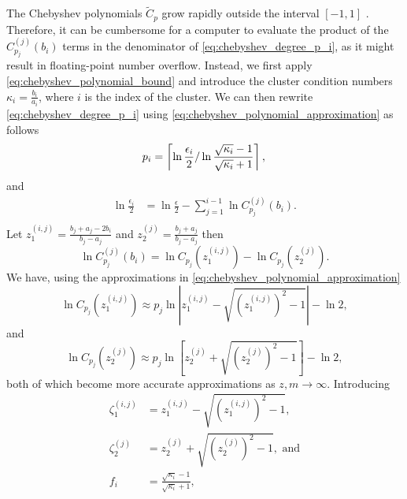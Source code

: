 The Chebyshev polynomials $\tilde{C}_p$ grow rapidly outside the interval $[-1,1]$ \cite[Section 4]{cg_sharpened_convrate_Axelsson1976}. Therefore, it can be cumbersome for a computer to evaluate the product of the $C^{(j)}_{p_j}(b_i)$ terms in the denominator of \cref{eq:chebyshev_degree_p_i}, as it might result in floating-point number overflow. Instead, we first apply \cref{eq:chebyshev_polynomial_bound} and introduce the cluster condition numbers $\kappa_i = \frac{b_i}{a_i}$, where $i$ is the index of the cluster. We can then rewrite \cref{eq:chebyshev_degree_p_i} using \cref{eq:chebyshev_polynomial_approximation} as follows
\begin{equation*}
    p_i  =  \left\lceil\ln{\frac{\epsilon_i}{2}} / \ln{\frac{\sqrt{\kappa_i} - 1}{\sqrt{\kappa_i} + 1}}\right\rceil, \\
\end{equation*}
and
\begin{align*}
    \ln{\frac{\epsilon_i}{2}} & = \ln{\frac{\epsilon}{2}} - \sum_{j=1}^{i-1} \ln{C^{(j)}_{p_j}(b_i)}. \\
\end{align*}
Let $z^{(i,j)}_1 = \frac{b_j + a_j - 2b_i}{b_j - a_j}$ and $z^{(j)}_2 = \frac{b_j + a_j}{b_j - a_j}$ then
\begin{equation*}
    \ln{C^{(j)}_{p_j}(b_i)} = \ln{C_{p_j}(z^{(i,j)}_1)} - \ln{C_{p_j}(z^{(j)}_2)}.
\end{equation*}
We have, using the approximations in \cref{eq:chebyshev_polynomial_approximation}
\begin{equation}
    \ln{C_{p_j}(z^{(i,j)}_1)} \approx p_j \ln{\left|z^{(i,j)}_1 - \sqrt{\left(z^{(i,j)}_1\right)^2 - 1}\right|} - \ln{2},
    \label{eq:chebyshev_polynomial_bound_z1}
\end{equation}
and
\begin{equation}
    \ln{C_{p_j}(z^{(j)}_2)} \approx p_j \ln{\left[z^{(j)}_2 + \sqrt{\left(z^{(j)}_2\right)^2 - 1}\right]} - \ln{2},
    \label{eq:chebyshev_polynomial_bound_z2}
\end{equation}
both of which become more accurate approximations as $z,m\rightarrow\infty$. Introducing 
\begin{align*}
    \zeta^{(i,j)}_1 &= z^{(i,j)}_1 - \sqrt{\left(z^{(i,j)}_1\right)^2 - 1}, \\
    \zeta^{(j)}_2 &= z^{(j)}_2 + \sqrt{\left(z^{(j)}_2\right)^2 - 1}, \text{ and}\\
    f_i &= \frac{\sqrt{\kappa_i} - 1}{\sqrt{\kappa_i} + 1},
\end{align*}
